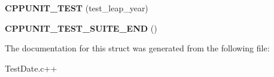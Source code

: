 \begin{DoxyCompactItemize}
\item 
\hypertarget{structTestDate_a8d88d28ae85e5a19e255f0d713c4ced8}{
{\bfseries CPPUNIT\_\-TEST} (test\_\-leap\_\-year)}
\label{structTestDate_a8d88d28ae85e5a19e255f0d713c4ced8}

\item 
\hypertarget{structTestDate_a543a115a8ff6f9b395c81aeac3a4643c}{
{\bfseries CPPUNIT\_\-TEST\_\-SUITE\_\-END} ()}
\label{structTestDate_a543a115a8ff6f9b395c81aeac3a4643c}

\end{DoxyCompactItemize}


The documentation for this struct was generated from the following file:\begin{DoxyCompactItemize}
\item 
TestDate.c++\end{DoxyCompactItemize}
